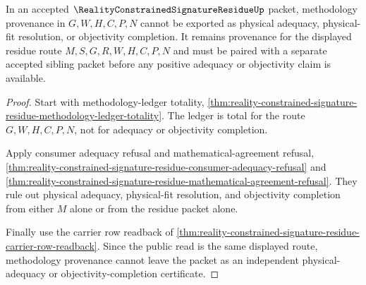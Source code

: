 \begin{theorem}
\label{thm:reality-constrained-signature-residue-methodology-provenance-nonescape}
In an accepted $\RealityConstrainedSignatureResidueUp$ packet, methodology
provenance in $G,W,H,C,P,N$ cannot be exported as physical adequacy,
physical-fit resolution, or objectivity completion. It remains provenance for
the displayed residue route $M,S,G,R,W,H,C,P,N$ and must be paired with a
separate accepted sibling packet before any positive adequacy or objectivity
claim is available.
\end{theorem}
\begin{proof}
Start with methodology-ledger totality,
\autoref{thm:reality-constrained-signature-residue-methodology-ledger-totality}.
The ledger is total for the route $G,W,H,C,P,N$, not for adequacy or objectivity
completion.

Apply consumer adequacy refusal and mathematical-agreement refusal,
\autoref{thm:reality-constrained-signature-residue-consumer-adequacy-refusal} and
\autoref{thm:reality-constrained-signature-residue-mathematical-agreement-refusal}.
They rule out physical adequacy, physical-fit resolution, and objectivity
completion from either $M$ alone or from the residue packet alone.

Finally use the carrier row readback of
\autoref{thm:reality-constrained-signature-residue-carrier-row-readback}. Since
the public read is the same displayed route, methodology provenance cannot
leave the packet as an independent physical-adequacy or objectivity-completion
certificate.
\end{proof}

